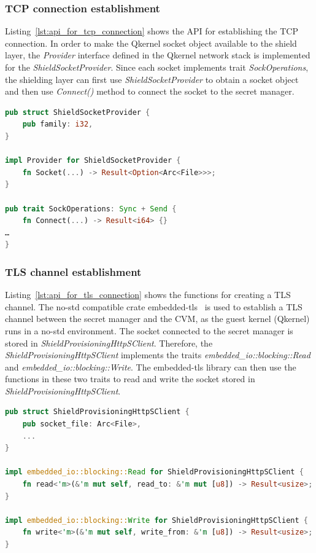 \subsubsection{TCP connection establishment}

Listing~\ref{lst:api_for_tcp_connection} shows the API for establishing the TCP connection. In order to make the Qkernel socket object available to the shield layer, the \emph{Provider} interface defined in the Qkernel network stack is implemented for the \emph{ShieldSocketProvider}. Since each 
socket implements trait \emph{SockOperations}, the shielding layer can first use \emph{ShieldSocketProvider} to obtain a socket object and then use \emph{Connect()} method to connect the socket to the secret manager.

\begin{lstlisting}[language=rust, caption= API for establishing the TCP connection, label={lst:api_for_tcp_connection}]
pub struct ShieldSocketProvider {
    pub family: i32,
}

impl Provider for ShieldSocketProvider {
    fn Socket(...) -> Result<Option<Arc<File>>>;
}

pub trait SockOperations: Sync + Send {
    fn Connect(...) -> Result<i64> {}
…
}    
\end{lstlisting}

\subsubsection{TLS channel establishment}
Listing~\ref{lst:api_for_tls_connection} shows the functions for creating a TLS channel. The no-std compatible crate embedded-tls~\cite*{embede_tls} is used to establish a TLS channel between the secret manager and the \acrshort{CVM}, as the guest kernel (Qkernel) runs in a no-std environment. The 
socket connected to the secret manager is stored in \emph{ShieldProvisioningHttpSClient}. Therefore, the \emph{ShieldProvisioningHttpSClient} implements the traits \emph{embedded\_io::blocking::Read} and \emph{embedded\_io::blocking::Write}. The embedded-tls library can then use the functions 
in these two traits to read and write the socket stored in \emph{ShieldProvisioningHttpSClient}.

\begin{lstlisting}[language=rust, caption= API for establishing the TLS channel, label={lst:api_for_tls_connection}]
pub struct ShieldProvisioningHttpSClient {
    pub socket_file: Arc<File>,
    ...
}

impl embedded_io::blocking::Read for ShieldProvisioningHttpSClient {
    fn read<'m>(&'m mut self, read_to: &'m mut [u8]) -> Result<usize>;
}

impl embedded_io::blocking::Write for ShieldProvisioningHttpSClient {
    fn write<'m>(&'m mut self, write_from: &'m [u8]) -> Result<usize>;
}
\end{lstlisting}
